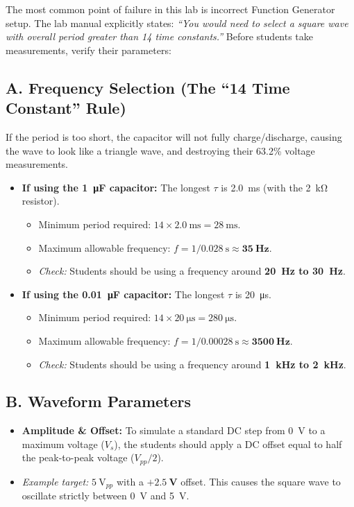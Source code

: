 \documentclass[11pt]{article}
\begin{document}
The most common point of failure in this lab is incorrect Function Generator setup. The lab manual explicitly states: \textit{``You would need to select a square wave with overall period greater than 14 time constants.''} Before students take measurements, verify their parameters:

\subsection*{A. Frequency Selection (The ``14 Time Constant'' Rule)}
If the period is too short, the capacitor will not fully charge/discharge, causing the wave to look like a triangle wave, and destroying their 63.2\% voltage measurements.
\begin{itemize}
  \item \textbf{If using the \SI{1}{\micro\farad} capacitor:} The longest $\tau$ is \SI{2.0}{\milli\second} (with the \SI{2}{\kilo\ohm} resistor).
    \begin{itemize}
      \item Minimum period required: $14 \times \SI{2.0}{\milli\second} = \SI{28}{\milli\second}$.
      \item Maximum allowable frequency: $f = 1 / \SI{0.028}{\second} \approx \mathbf{\SI{35}{\hertz}}$.
      \item \textit{Check:} Students should be using a frequency around \textbf{\SI{20}{\hertz} to \SI{30}{\hertz}}.
    \end{itemize}
  \item \textbf{If using the \SI{0.01}{\micro\farad} capacitor:} The longest $\tau$ is \SI{20}{\micro\second}.
    \begin{itemize}
      \item Minimum period required: $14 \times \SI{20}{\micro\second} = \SI{280}{\micro\second}$.
      \item Maximum allowable frequency: $f = 1 / \SI{0.00028}{\second} \approx \mathbf{\SI{3500}{\hertz}}$.
      \item \textit{Check:} Students should be using a frequency around \textbf{\SI{1}{\kilo\hertz} to \SI{2}{\kilo\hertz}}.
    \end{itemize}
\end{itemize}

\subsection*{B. Waveform Parameters}
\begin{itemize}
  \item \textbf{Amplitude \& Offset:} To simulate a standard DC step from \SI{0}{\volt} to a maximum voltage ($V_s$), the students should apply a DC offset equal to half the peak-to-peak voltage ($V_{pp}/2$).
  \item \textit{Example target:} $\SI{5}{\volt}_{pp}$ with a $\mathbf{+\SI{2.5}{\volt}}$ offset. This causes the square wave to oscillate strictly between \SI{0}{\volt} and \SI{+5}{\volt}.
\end{itemize}
\end{document}
